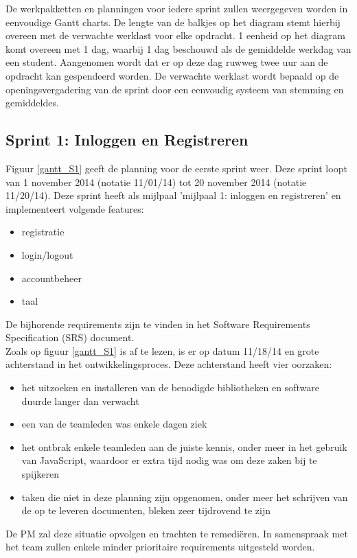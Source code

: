 \documentclass{article}
\begin{document}
\noindent De werkpakketten en planningen voor iedere sprint zullen weergegeven worden in eenvoudige Gantt charts. De lengte van de balkjes op het diagram stemt hierbij overeen met de verwachte werklast voor elke opdracht. 1 eenheid op het diagram komt overeen met 1 dag, waarbij 1 dag beschouwd als de gemiddelde werkdag van een student. Aangenomen wordt dat er op deze dag ruwweg twee uur aan de opdracht kan gespendeerd worden. De verwachte werklast wordt bepaald op de openingsvergadering van de sprint door een eenvoudig systeem van stemming en gemiddeldes. \newline

%
\subsection{Sprint 1:  Inloggen en Registreren}

Figuur \ref{gantt_S1} geeft de planning voor de eerste sprint weer. Deze sprint loopt van 1 november 2014 (notatie 11/01/14)  tot 20 november 2014 (notatie 11/20/14). Deze sprint heeft als mijlpaal 'mijlpaal 1: inloggen en registreren' en implementeert volgende features:
\begin{itemize}
\item registratie
\item login/logout
\item accountbeheer
\item taal
\end{itemize}

\noindent De bijhorende requirements zijn te vinden in het Software Requirements Specification (SRS) document. \newline
\\
\noindent Zoals op figuur \ref{gantt_S1}  is af te lezen, is er op datum 11/18/14 en grote achterstand in het ontwikkelingsproces. Deze achterstand heeft vier oorzaken: 
\begin{itemize}
\item het uitzoeken en installeren van de benodigde bibliotheken en software duurde langer dan verwacht
\item een van de teamleden was enkele dagen ziek
\item het ontbrak enkele teamleden aan de juiste kennis, onder meer in het gebruik van JavaScript, waardoor er extra tijd nodig was om deze zaken bij te spijkeren 
\item taken die niet in deze planning zijn opgenomen, onder meer het schrijven van de op te leveren documenten, bleken zeer tijdrovend te zijn
\end{itemize}
De PM zal deze situatie opvolgen en trachten te remedi\"{e}ren. In samenspraak met het team zullen enkele minder prioritaire requirements uitgesteld worden. 
\end{document}
